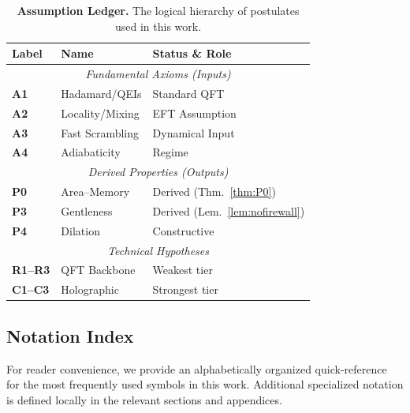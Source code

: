 \documentclass[11pt,a4paper]{article}
\theoremstyle{plain}
\theoremstyle{definition}
\theoremstyle{remark}
\begin{document}
\begin{table}[h!]
\centering
\caption{\textbf{Assumption Ledger.} The logical hierarchy of postulates used in this work.}
\label{tab:assumption_ledger}
\small
\begin{tabular*}{\textwidth}{@{\extracolsep{\fill}}lll@{}}
\toprule
\textbf{Label} & \textbf{Name} & \textbf{Status \& Role} \\
\midrule
\multicolumn{3}{c}{\textit{Fundamental Axioms (Inputs)}} \\
\midrule
\textbf{A1} & Hadamard/QEIs & Standard QFT \\
\textbf{A2} & Locality/Mixing & EFT Assumption \\
\textbf{A3} & Fast Scrambling & Dynamical Input \\
\textbf{A4} & Adiabaticity & Regime \\
\midrule
\multicolumn{3}{c}{\textit{Derived Properties (Outputs)}} \\
\midrule
\textbf{P0} & Area--Memory & Derived (Thm.~\ref{thm:P0}) \\
\textbf{P3} & Gentleness & Derived (Lem.~\ref{lem:nofirewall}) \\
\textbf{P4} & Dilation & Constructive \\
\midrule
\multicolumn{3}{c}{\textit{Technical Hypotheses}} \\
\midrule
\textbf{R1--R3} & QFT Backbone & Weakest tier \\
\textbf{C1--C3} & Holographic & Strongest tier \\
\bottomrule
\end{tabular*}
\end{table}

\subsection{Notation Index}
For reader convenience, we provide an alphabetically organized quick-reference for the most frequently used symbols in this work. Additional specialized notation is defined locally in the relevant sections and appendices.
\end{document}
